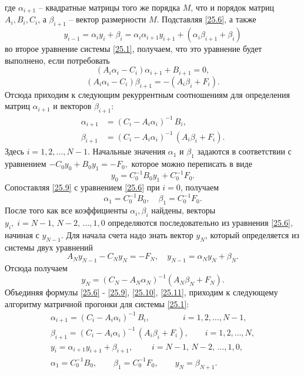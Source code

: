 где $\alpha_{i+1}$ -- квадратные матрицы того же порядка $M$, что и порядок матриц $A_i, B_i, C_i$, а $\beta_{i+1}$ -- вектор размерности $M$. Подставляя \eqref{25.6}, а также 
$$y_{i-1} = \alpha_{i} y_{i} + \beta_{i} = \alpha_i \alpha_{i+1} y_{i+1} + (\alpha_i \beta_{i+1} + \beta_i)$$ 
во второе уравнение системы \eqref{25.1}, получаем, что это уравнение будет выполнено, если потребовать 
$$
(A_i \alpha_i - C_i) \alpha_{i+1} + B_{i+1} = 0,
$$
$$
(A_i \alpha_i - C_i) \beta_{i+1} = - (A_i\beta_i + F_i).
$$
Отсюда приходим к следующим рекуррентным соотношениям для определения матриц $\alpha_{i+1}$ и векторов $\beta_{i+1}$:
\begin{align}\label{25.7}
    \alpha_{i+1} &= (C_i - A_i \alpha_i)^{-1} \, B_i,\\
    \label{25.8}
    \beta_{i+1} &= (C_i - A_i \alpha_i)^{-1} \,(A_i \beta_i + F_i).
\end{align}
Здесь $i = 1, 2, \ldots, N-1$. Начальные значения $\alpha_1$ и $\beta_1$ задаются в соответствии с уравнением $-C_0 y_0 + B_0 y_1 = -F_0,$ которое можно переписать в виде 
\begin{equation}\label{25.9}
    y_0 = C_0^{-1} B_0 y_1 + C_0^{-1}F_0.
\end{equation}
Сопоставляя \eqref{25.9} с уравнением \eqref{25.6} при $i = 0$, получаем
\begin{equation}\label{25.10}
    \alpha_1 = C_0^{-1}B_0, \quad \beta_1 = C_0^{-1}F_0.
\end{equation}
После того как все коэффициенты $\alpha_i, \beta_i$ найдены, векторы $y_i, \; i = N-1, \,N-2, \,\ldots, 1, 0$ определяются последовательно из уравнения \eqref{25.6}, начиная с $y_{N-1}$. Для начала счета надо знать вектор $y_N$, который определяется из системы двух уравнений 
$$
A_N y_{N-1} - C_N y_N = - F_N, \quad y_{N-1} = \alpha_N y_N + \beta_N.
$$
Отсюда получаем 
\begin{equation}\label{25.11}
    y_N = (C_N - A_N \alpha_N)^{-1} (A_N \beta_N + F_N).
\end{equation}
Объединяя формулы \eqref{25.6} - \eqref{25.9}, \eqref{25.10}, \eqref{25.11}, приходим к следующему алгоритму матричной прогонки для системы \eqref{25.1}: 
\begin{equation}\label{25.12}
    \begin{gathered}
            \alpha_{i+1}  =(C_i - A_i \alpha_i)^{-1} \, B_i, \quad\qquad\quad i = 1,2, \ldots, N-1,\\
    \beta_{i+1} = (C_i - A_i \alpha_i)^{-1} \,(A_i \beta_i + F_i), \quad\quad i = 1,2, \ldots, N,\\
    y_i = \alpha_{i+1} y_{i+1} + \beta_{i+1}, \qquad\; i = N-1, \,N-2, \,\ldots, 1, 0,\\
    \alpha_1  = C_0^{-1}B_0,\qquad
    \beta_1 = C_0^{-1}F_0,\qquad
    y_N = \beta_{N+1}. 
    \end{gathered}
\end{equation}

